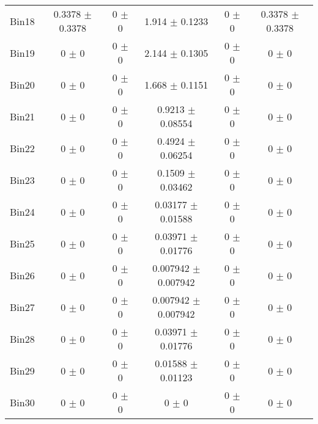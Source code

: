 \begin{tabular}{@{\extracolsep{4pt}}lccccc@{}}
     Bin18 & 0.3378 $\pm$ 0.3378 & 0 $\pm$ 0 & 1.914 $\pm$ 0.1233 & 0 $\pm$ 0 & 0.3378 $\pm$ 0.3378 \\ 
     Bin19 & 0 $\pm$ 0 & 0 $\pm$ 0 & 2.144 $\pm$ 0.1305 & 0 $\pm$ 0 & 0 $\pm$ 0 \\ 
     Bin20 & 0 $\pm$ 0 & 0 $\pm$ 0 & 1.668 $\pm$ 0.1151 & 0 $\pm$ 0 & 0 $\pm$ 0 \\ 
     Bin21 & 0 $\pm$ 0 & 0 $\pm$ 0 & 0.9213 $\pm$ 0.08554 & 0 $\pm$ 0 & 0 $\pm$ 0 \\ 
     Bin22 & 0 $\pm$ 0 & 0 $\pm$ 0 & 0.4924 $\pm$ 0.06254 & 0 $\pm$ 0 & 0 $\pm$ 0 \\ 
     Bin23 & 0 $\pm$ 0 & 0 $\pm$ 0 & 0.1509 $\pm$ 0.03462 & 0 $\pm$ 0 & 0 $\pm$ 0 \\ 
     Bin24 & 0 $\pm$ 0 & 0 $\pm$ 0 & 0.03177 $\pm$ 0.01588 & 0 $\pm$ 0 & 0 $\pm$ 0 \\ 
     Bin25 & 0 $\pm$ 0 & 0 $\pm$ 0 & 0.03971 $\pm$ 0.01776 & 0 $\pm$ 0 & 0 $\pm$ 0 \\ 
     Bin26 & 0 $\pm$ 0 & 0 $\pm$ 0 & 0.007942 $\pm$ 0.007942 & 0 $\pm$ 0 & 0 $\pm$ 0 \\ 
     Bin27 & 0 $\pm$ 0 & 0 $\pm$ 0 & 0.007942 $\pm$ 0.007942 & 0 $\pm$ 0 & 0 $\pm$ 0 \\ 
     Bin28 & 0 $\pm$ 0 & 0 $\pm$ 0 & 0.03971 $\pm$ 0.01776 & 0 $\pm$ 0 & 0 $\pm$ 0 \\ 
     Bin29 & 0 $\pm$ 0 & 0 $\pm$ 0 & 0.01588 $\pm$ 0.01123 & 0 $\pm$ 0 & 0 $\pm$ 0 \\ 
     Bin30 & 0 $\pm$ 0 & 0 $\pm$ 0 & 0 $\pm$ 0 & 0 $\pm$ 0 & 0 $\pm$ 0 \\ 
\hline\hline
  \end{tabular}
